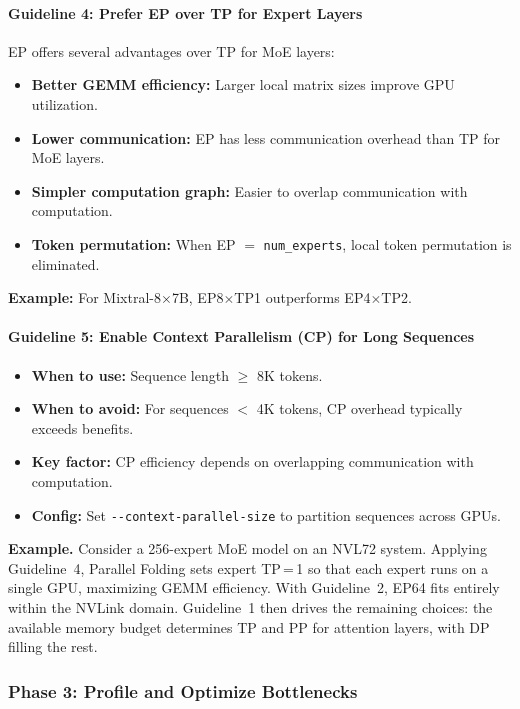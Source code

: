 \paragraph*{Guideline 4: Prefer EP over TP for Expert Layers}
EP offers several advantages over TP for MoE layers:
\begin{itemize}
    \item \textbf{Better GEMM efficiency:} Larger local matrix sizes improve GPU utilization.
    \item \textbf{Lower communication:} EP has less communication overhead than TP for MoE layers.
    \item \textbf{Simpler computation graph:} Easier to overlap communication with computation.
    \item \textbf{Token permutation:} When EP $=$ \texttt{num\_experts}, local token permutation is eliminated.
\end{itemize}

\noindent\textbf{Example:} For Mixtral-8$\times$7B, EP8$\times$TP1 outperforms EP4$\times$TP2.

\paragraph*{Guideline 5: Enable Context Parallelism (CP) for Long Sequences}
\begin{itemize}
    \item \textbf{When to use:} Sequence length $\geq$ 8K tokens.
    \item \textbf{When to avoid:} For sequences $<$ 4K tokens, CP overhead typically exceeds benefits.
    \item \textbf{Key factor:} CP efficiency depends on overlapping communication with computation.
    \item \textbf{Config:} Set \texttt{-{}-context-parallel-size} to partition sequences across GPUs.
\end{itemize}

\noindent\textbf{Example.} Consider a 256-expert MoE model on an NVL72 system. Applying Guideline~4, Parallel Folding sets expert TP\,=\,1 so that each expert runs on a single GPU, maximizing GEMM efficiency. With Guideline~2, EP64 fits entirely within the NVLink domain. Guideline~1 then drives the remaining choices: the available memory budget determines TP and PP for attention layers, with DP filling the rest.

\subsubsection{Phase 3: Profile and Optimize Bottlenecks}

